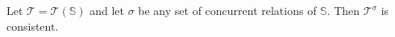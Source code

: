 Let $\mathcal{T} = \mathcal{T}(\mathbb{S})$ and let $\sigma$ be any set of concurrent relations of $\mathbb{S}$. Then $\mathcal{T}^\sigma$ is consistent.
